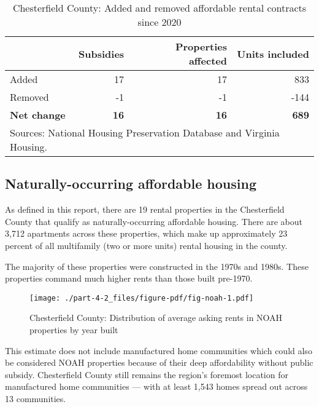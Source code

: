 \documentclass[
  letterpaper,
  DIV=11,
  numbers=noendperiod]{scrreprt}
\begin{document}
\hypertarget{tbl-nhpd}{}
\begin{table}
\caption{\label{tbl-nhpd}Chesterfield County: Added and removed affordable rental contracts since
2020 }\tabularnewline

\centering
\begin{tabular}{l|r|r|r}
\hline
 & Subsidies & Properties affected & Units included\\
\hline
Added & 17 & 17 & 833\\
\hline
Removed & -1 & -1 & -144\\
\hline
\textbf{Net change} & \textbf{16} & \textbf{16} & \textbf{689}\\
\hline
\multicolumn{4}{l}{\rule{0pt}{1em}Sources: National Housing Preservation Database and Virginia Housing.}\\
\end{tabular}
\end{table}

\hypertarget{naturally-occurring-affordable-housing-2}{%
\subsection{Naturally-occurring affordable
housing}\label{naturally-occurring-affordable-housing-2}}

As defined in this report, there are 19 rental properties in the
Chesterfield County that qualify as naturally-occurring affordable
housing. There are about 3,712 apartments across these properties, which
make up approximately 23 percent of all multifamily (two or more units)
rental housing in the county.

The majority of these properties were constructed in the 1970s and
1980s. These properties command much higher rents than those built
pre-1970.

\begin{figure}

{\centering \texttt{[image: ./part-4-2\_files/figure-pdf/fig-noah-1.pdf]}

}

\caption{\label{fig-noah}Chesterfield County: Distribution of average
asking rents in NOAH properties by year built}

\end{figure}

This estimate does not include manufactured home communities which could
also be considered NOAH properties because of their deep affordability
without public subsidy. Chesterfield County still remains the region's
foremost location for manufactured home communities --- with at least
1,543 homes spread out across 13 communities.
\end{document}
